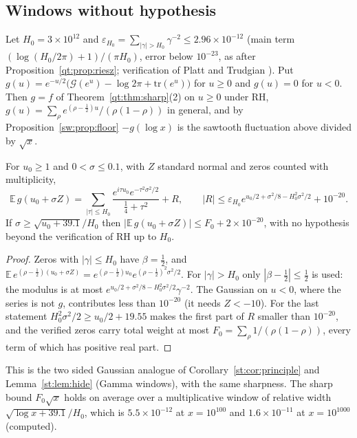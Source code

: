 \subsection{Windows without hypothesis}

Let $H_0=3\times10^{12}$ and $\varepsilon_{H_0}=\sum_{|\gamma|>H_0}\gamma^{-2}\le2.96\times10^{-12}$ (main term $(\log(H_0/2\pi)+1)/(\pi H_0)$, error below $10^{-23}$, as after Proposition~\ref{qt:prop:riesz}; verification of Platt and Trudgian \cite{PT21}). Put $g(u)=e^{-u/2}\bigl(\mathcal G(e^u)-\log2\pi+\mathrm{tr}(e^u)\bigr)$ for $u\ge0$ and $g(u)=0$ for $u<0$. Then $g=f$ of Theorem~\ref{qt:thm:sharp}(2) on $u\ge0$ under RH, $g(u)=\sum_\rho e^{(\rho-\frac12)u}/(\rho(1-\rho))$ in general, and by Proposition~\ref{sw:prop:floor} $-g(\log x)$ is the sawtooth fluctuation above divided by $\sqrt x$.

\begin{theorem}\label{sw:thm:window}
For $u_0\ge1$ and $0<\sigma\le0.1$, with $Z$ standard normal and zeros counted with multiplicity,
\[
\mathbb E\,g(u_0+\sigma Z)=\sum_{|\tau|\le H_0}\frac{e^{i\tau u_0}e^{-\tau^2\sigma^2/2}}{\frac14+\tau^2}+R,\qquad|R|\le\varepsilon_{H_0}e^{u_0/2+\sigma^2/8-H_0^2\sigma^2/2}+10^{-20}.
\]
If $\sigma\ge\sqrt{u_0+39.1}/H_0$ then $|\mathbb E\,g(u_0+\sigma Z)|\le F_0+2\times10^{-20}$, with no hypothesis beyond the verification of RH up to $H_0$.
\end{theorem}

\begin{proof}
Zeros with $|\gamma|\le H_0$ have $\beta=\frac12$, and $\mathbb E\,e^{(\rho-\frac12)(u_0+\sigma Z)}=e^{(\rho-\frac12)u_0}e^{(\rho-\frac12)^2\sigma^2/2}$. For $|\gamma|>H_0$ only $|\beta-\frac12|\le\frac12$ is used: the modulus is at most $e^{u_0/2+\sigma^2/8-H_0^2\sigma^2/2}\gamma^{-2}$. The Gaussian on $u<0$, where the series is not $g$, contributes less than $10^{-20}$ (it needs $Z<-10$). For the last statement $H_0^2\sigma^2/2\ge u_0/2+19.55$ makes the first part of $R$ smaller than $10^{-20}$, and the verified zeros carry total weight at most $F_0=\sum_\rho1/(\rho(1-\rho))$, every term of which has positive real part.
\end{proof}

This is the two sided Gaussian analogue of Corollary~\ref{st:cor:principle} and Lemma~\ref{st:lem:hide} (Gamma windows), with the same sharpness. The sharp bound $F_0\sqrt x$ holds on average over a multiplicative window of relative width $\sqrt{\log x+39.1}/H_0$, which is $5.5\times10^{-12}$ at $x=10^{100}$ and $1.6\times10^{-11}$ at $x=10^{1000}$ (computed).


